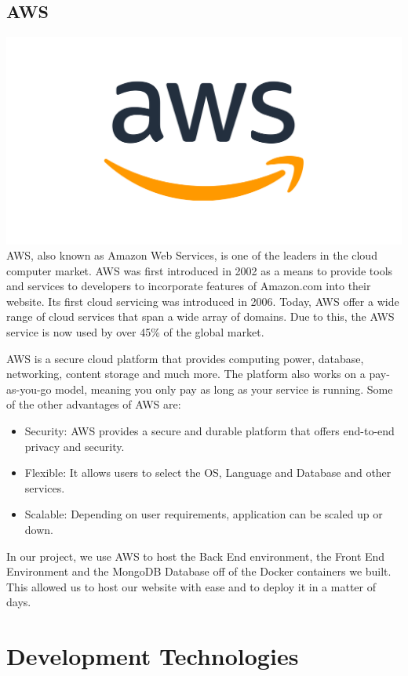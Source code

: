 \subsection{AWS}
\includegraphics[scale = 0.4]{img/aws_logo_smile_1200x630.png}\newline
AWS, also known as Amazon Web Services, is one of the leaders in the cloud computer market. AWS was first introduced in 2002 as a means to provide tools and services to developers to incorporate features of Amazon.com into their website. Its first cloud servicing was introduced in 2006. Today, AWS offer a wide range of cloud services that span a wide array of domains. Due to this, the AWS service is now used by over 45\% of the global market. \par
AWS is a secure cloud platform that provides computing power, database, networking, content storage and much more. The platform also works on a pay-as-you-go model, meaning you only pay as long as your service is running. Some of the other advantages of AWS are:
\begin{itemize}
    \item Security: AWS provides a secure and durable platform that offers end-to-end privacy and security.
    \item Flexible: It allows users to select the OS, Language and Database and other services.
    \item Scalable: Depending on user requirements, application can be scaled up or down.
\end{itemize}
In our project, we use AWS to host the Back End environment, the Front End Environment and the MongoDB Database off of the Docker containers we built. This allowed us to host our website with ease and to deploy it in a matter of days.
\section{Development Technologies}

